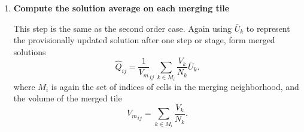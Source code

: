 \begin{enumerate}
\item 
\textbf{Compute the solution average on each merging tile}

This step is the same as the second order case.
Again using $\bar{U}_k$ to represent the provisionally updated 
solution after one step or stage, form merged solutions 
\begin{equation}\label{eq:q_avg1}
     \widehat{Q}_{ij} =  \frac{1}{ V_m}_{ij} \, \sum_{k \in
     M_i}\frac{V_k}{N_k} \bar U_k.
\end{equation}
\noindent where $M_i$ is again the set of indices of cells in the 
merging neighborhood, and the volume of the merged tile 
\begin{equation}\label{eq:modV}
{V_m}_{ij} = \sum_{k \in M_i}\frac{V_k}{N_k} .
\end{equation}


\end{enumerate}
